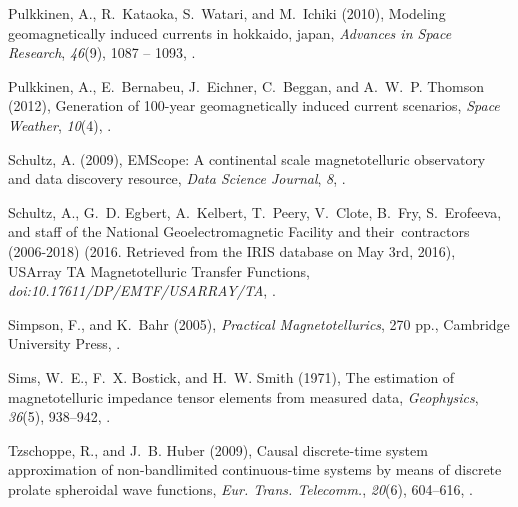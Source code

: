 \documentclass[linenumbers,draft]{agujournal}
\begin{document}
\begin{thebibliography}{28}
Pulkkinen, A., R.~Kataoka, S.~Watari, and M.~Ichiki (2010), Modeling
  geomagnetically induced currents in hokkaido, japan, \textit{Advances in
  Space Research}, \textit{46}(9), 1087 -- 1093,
  .

Pulkkinen, A., E.~Bernabeu, J.~Eichner, C.~Beggan, and A.~W.~P. Thomson (2012),
  Generation of 100-year geomagnetically induced current scenarios,
  \textit{Space Weather}, \textit{10}(4), .

Schultz, A. (2009), {EMScope}: A continental scale magnetotelluric observatory
  and data discovery resource, \textit{Data Science Journal}, \textit{8},
  .

Schultz, A., G.~D. Egbert, A.~Kelbert, T.~Peery, V.~Clote, B.~Fry, S.~Erofeeva,
  and staff of the National Geoelectromagnetic Facility {and} their~contractors
  (2006-2018) (2016. Retrieved from the IRIS database on May 3rd, 2016),
  {USArray TA Magnetotelluric Transfer Functions},
  \textit{doi:10.17611/DP/EMTF/USARRAY/TA}, .

{Simpson}, F., and K.~{Bahr} (2005), \textit{{Practical Magnetotellurics}}, 270
  pp., Cambridge University Press, .

Sims, W.~E., F.~X. Bostick, and H.~W. Smith (1971), The estimation of
  magnetotelluric impedance tensor elements from measured data,
  \textit{Geophysics}, \textit{36}(5), 938--942, .

Tzschoppe, R., and J.~B. Huber (2009), Causal discrete-time system
  approximation of non-bandlimited continuous-time systems by means of discrete
  prolate spheroidal wave functions, \textit{Eur. Trans. Telecomm.},
  \textit{20}(6), 604--616, .


\end{thebibliography}
\end{document}
